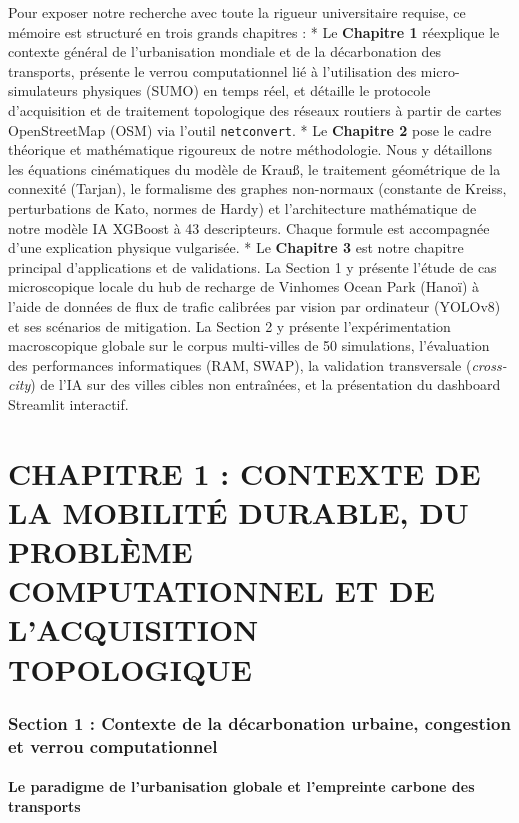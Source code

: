 \documentclass[10pt, a4paper]{article}
\begin{document}
Pour exposer notre recherche avec toute la rigueur universitaire
requise, ce mémoire est structuré en trois grands chapitres : * Le
\textbf{Chapitre 1} réexplique le contexte général de l'urbanisation
mondiale et de la décarbonation des transports, présente le verrou
computationnel lié à l'utilisation des micro-simulateurs physiques
(SUMO) en temps réel, et détaille le protocole d'acquisition et de
traitement topologique des réseaux routiers à partir de cartes
OpenStreetMap (OSM) via l'outil \texttt{netconvert}. * Le
\textbf{Chapitre 2} pose le cadre théorique et mathématique rigoureux de
notre méthodologie. Nous y détaillons les équations cinématiques du
modèle de Krauß, le traitement géométrique de la connexité (Tarjan), le
formalisme des graphes non-normaux (constante de Kreiss, perturbations
de Kato, normes de Hardy) et l'architecture mathématique de notre modèle
IA XGBoost à 43 descripteurs. Chaque formule est accompagnée d'une
explication physique vulgarisée. * Le \textbf{Chapitre 3} est notre
chapitre principal d'applications et de validations. La Section 1 y
présente l'étude de cas microscopique locale du hub de recharge de
Vinhomes Ocean Park (Hanoï) à l'aide de données de flux de trafic
calibrées par vision par ordinateur (YOLOv8) et ses scénarios de
mitigation. La Section 2 y présente l'expérimentation macroscopique
globale sur le corpus multi-villes de 50 simulations, l'évaluation des
performances informatiques (RAM, SWAP), la validation transversale
(\emph{cross-city}) de l'IA sur des villes cibles non entraînées, et la
présentation du dashboard Streamlit interactif.

\newpage

\section{CHAPITRE 1 : CONTEXTE DE LA MOBILITÉ DURABLE, DU PROBLÈME
COMPUTATIONNEL ET DE L'ACQUISITION
TOPOLOGIQUE}\label{chapitre-1-contexte-de-la-mobilituxe9-durable-du-probluxe8me-computationnel-et-de-lacquisition-topologique}

\subsubsection{Section 1 : Contexte de la décarbonation urbaine,
congestion et verrou
computationnel}\label{section-1-contexte-de-la-duxe9carbonation-urbaine-congestion-et-verrou-computationnel}

\paragraph{Le paradigme de l'urbanisation globale et l'empreinte carbone
des
transports}\label{le-paradigme-de-lurbanisation-globale-et-lempreinte-carbone-des-transports}
\end{document}
